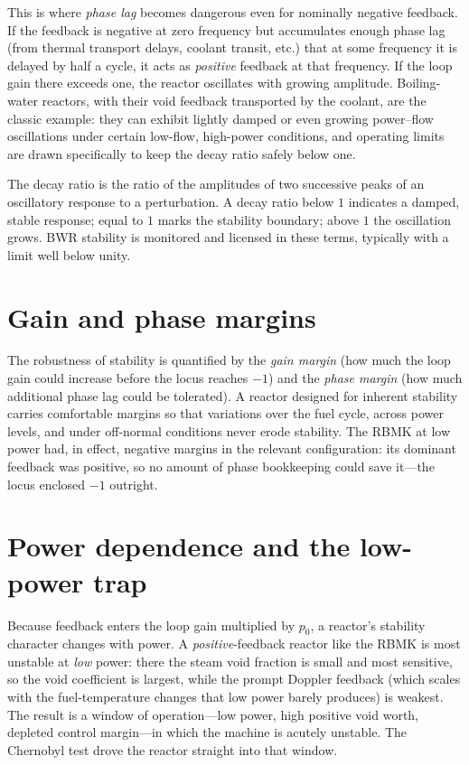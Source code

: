 This is where \emph{phase lag} becomes dangerous even for nominally negative
feedback. If the feedback is negative at zero frequency but accumulates enough
phase lag (from thermal transport delays, coolant transit, etc.) that at some
frequency it is delayed by half a cycle, it acts as \emph{positive} feedback at
that frequency. If the loop gain there exceeds one, the reactor oscillates with
growing amplitude. Boiling-water reactors, with their void feedback transported
by the coolant, are the classic example: they can exhibit lightly damped or even
growing power--flow oscillations under certain low-flow, high-power conditions,
and operating limits are drawn specifically to keep the decay ratio safely below
one.

\begin{definition}
The decay ratio is the ratio of the amplitudes of two successive peaks of an
oscillatory response to a perturbation. A decay ratio below $1$ indicates a
damped, stable response; equal to $1$ marks the stability boundary; above $1$ the
oscillation grows. BWR stability is monitored and licensed in these terms,
typically with a limit well below unity.
\end{definition}

\section{Gain and phase margins}

The robustness of stability is quantified by the \emph{gain margin} (how much the
loop gain could increase before the locus reaches $-1$) and the \emph{phase
margin} (how much additional phase lag could be tolerated). A reactor designed for
inherent stability carries comfortable margins so that variations over the fuel
cycle, across power levels, and under off-normal conditions never erode stability.
The RBMK at low power had, in effect, negative margins in the relevant
configuration: its dominant feedback was positive, so no amount of phase
bookkeeping could save it---the locus enclosed $-1$ outright.

\section{Power dependence and the low-power trap}

Because feedback enters the loop gain multiplied by $p_0$, a reactor's stability
character changes with power. A \emph{positive}-feedback reactor like the RBMK is
most unstable at \emph{low} power: there the steam void fraction is small and most
sensitive, so the void coefficient is largest, while the prompt Doppler feedback
(which scales with the fuel-temperature changes that low power barely produces) is
weakest. The result is a window of operation---low power, high positive void
worth, depleted control margin---in which the machine is acutely unstable. The
Chernobyl test drove the reactor straight into that window.

